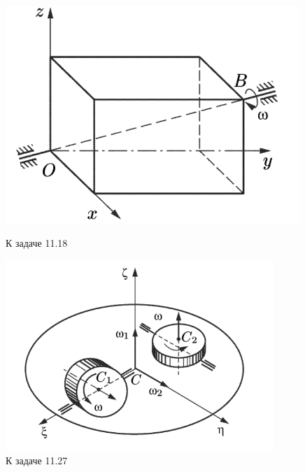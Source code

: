 \begin{figure}
        \begin{minipage}[b]{0.3\textwidth}
            \includegraphics[width=0.99\textwidth]{figures/1.png}
            \caption{К задаче 11.18}
        \end{minipage}
        \hspace{0.5cm} 
        \begin{minipage}[b]{0.35\textwidth}
            \includegraphics[width=0.9\textwidth]{figures/2.png}
            \caption{К задаче 11.27}
        \end{minipage}
        \hspace{0.5cm} 
        \begin{minipage}[b]{0.35\textwidth}

\end{minipage}
\end{figure}
